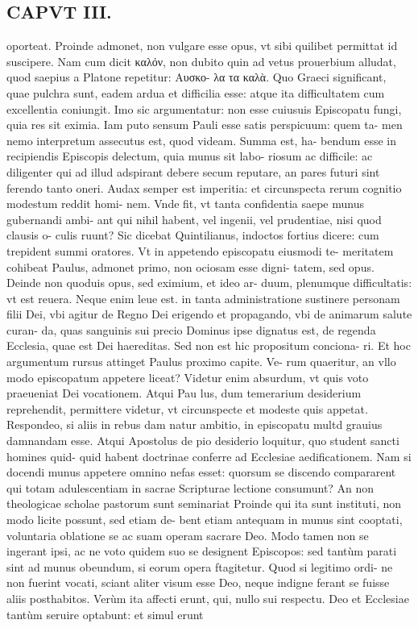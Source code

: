 \documentclass{article}
\begin{document}
\begin{pages}
\section*{CAPVT III. }
\marginpar{[ p.31 ]}\pstart oporteat. Proinde admonet, non vulgare esse opus, vt sibi quilibet permittat id suscipere. Nam cum dicit καλόν, non dubito quin ad vetus prouerbium alludat, quod saepius a Platone repetitur: Αυσκο- λα τα καλὰ. Quo Graeci significant, quae pulchra sunt, eadem ardua et difficilia esse: atque ita difficultatem cum excellentia coniungit. Imo sic argumentatur: non esse cuiusuis Episcopatu fungi, quia res sit eximia. Iam puto sensum Pauli esse satis perspicuum: quem ta- men nemo interpretum assecutus est, quod videam. Summa est, ha- bendum esse in recipiendis Episcopis delectum, quia munus sit labo- riosum ac difficile: ac diligenter qui ad illud adspirant debere secum reputare, an pares futuri sint ferendo tanto oneri. Audax semper est imperitia: et circunspecta rerum cognitio modestum reddit homi- nem. Vnde fit, vt tanta confidentia saepe munus gubernandi ambi- ant qui nihil habent, vel ingenii, vel prudentiae, nisi quod clausis o- culis ruunt? Sic dicebat Quintilianus, indoctos fortius dicere: cum trepident summi oratores. Vt in appetendo episcopatu eiusmodi te- meritatem cohibeat Paulus, admonet primo, non ociosam esse digni- tatem, sed opus. Deinde non quoduis opus, sed eximium, et ideo ar- duum, plenumque difficultatis: vt est reuera. Neque enim leue est. in tanta administratione sustinere personam filii Dei, vbi agitur de Regno Dei erigendo et propagando, vbi de animarum salute curan- da, quas sanguinis sui precio Dominus ipse dignatus est, de regenda Ecclesia, quae est Dei haereditas. Sed non est hic propositum conciona- ri. Et hoc argumentum rursus attinget Paulus proximo capite. Ve- rum quaeritur, an vllo modo episcopatum appetere liceat? Videtur enim absurdum, vt quis voto praeueniat Dei vocationem. Atqui Pau lus, dum temerarium desiderium reprehendit, permittere videtur, vt circunspecte et modeste quis appetat. Respondeo, si aliis in rebus dam natur ambitio, in episcopatu multd grauius damnandam esse. Atqui Apostolus de pio desiderio loquitur, quo student sancti homines quid- quid habent doctrinae conferre ad Ecclesiae aedificationem. Nam si docendi munus appetere omnino nefas esset: quorsum se discendo compararent qui totam adulescentiam in sacrae Scripturae lectione consumunt? An non theologicae scholae pastorum sunt seminariat Proinde qui ita sunt instituti, non modo licite possunt, sed etiam de- bent etiam antequam in munus sint cooptati, voluntaria oblatione se ac suam operam sacrare Deo. Modo tamen non se ingerant ipsi, ac ne voto quidem suo se designent Episcopos: sed tantùm parati sint ad munus obeundum, si eorum opera ftagitetur. Quod si legitimo ordi- ne non fuerint vocati, sciant aliter visum esse Deo, neque indigne ferant se fuisse aliis posthabitos. Verùm ita affecti erunt, qui, nullo sui respectu. Deo et Ecclesiae tantùm seruire optabunt: et simul erunt  \pend

\end{pages}
\end{document}
